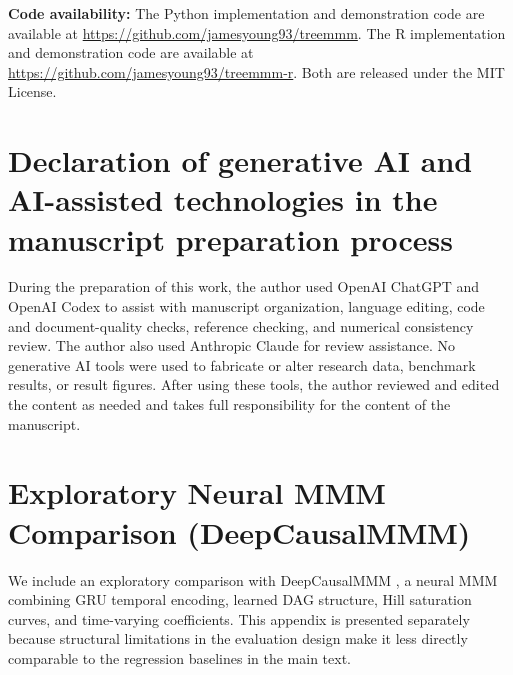 \documentclass[review,12pt]{elsarticle}
\begin{document}
\textbf{Code availability:}
The Python implementation and demonstration code are available at
\url{https://github.com/jamesyoung93/treemmm}. The R implementation and
demonstration code are available at
\url{https://github.com/jamesyoung93/treemmm-r}. Both are released under the
MIT License.


\section*{Declaration of generative AI and AI-assisted technologies in the
manuscript preparation process}

During the preparation of this work, the author used OpenAI ChatGPT and
OpenAI Codex to assist with manuscript organization, language editing, code and
document-quality checks, reference checking, and numerical consistency review.
The author also used Anthropic Claude for review assistance.
No generative AI tools were used to fabricate or alter research data, benchmark
results, or result figures. After using these tools, the author reviewed and
edited the content as needed and takes full responsibility for the content of
the manuscript.


\begingroup
\sloppy


\endgroup


\appendix

\section{Exploratory Neural MMM Comparison (DeepCausalMMM)}
\label{app:neural}

We include an exploratory comparison with DeepCausalMMM
\cite{tirumala2025deepcausalmmm}, a neural MMM combining GRU temporal encoding,
learned DAG structure, Hill saturation curves, and time-varying coefficients.
This appendix is presented separately because structural limitations in the
evaluation design make it less directly comparable to the regression baselines
in the main text.
\end{document}
